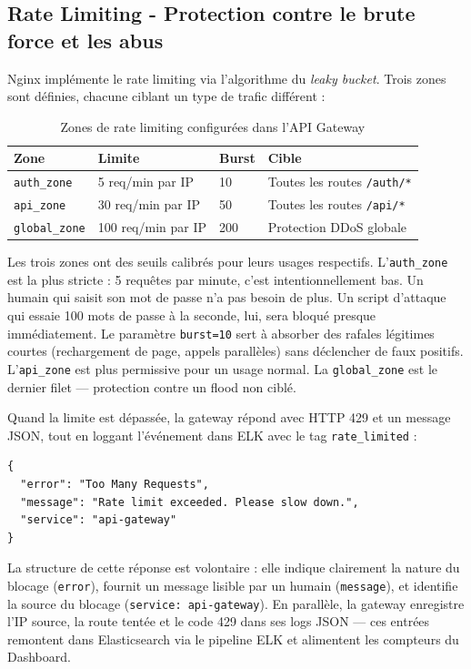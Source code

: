 \documentclass[12pt, a4paper]{report}
\begin{document}
\subsection{Rate Limiting - Protection contre le brute force et les abus}

Nginx implémente le rate limiting via l'algorithme du \textit{leaky bucket}. Trois zones sont définies, chacune ciblant un type de trafic différent :

\begin{table}[H]
  \centering
  \caption{Zones de rate limiting configurées dans l'API Gateway}
  \begin{tabular}{@{}llll@{}}
    \toprule
    \textbf{Zone} & \textbf{Limite} & \textbf{Burst} & \textbf{Cible} \\
    \midrule
    \texttt{auth\_zone}   & 5 req/min par IP  & 10  & Toutes les routes \texttt{/auth/*} \\
    \texttt{api\_zone}    & 30 req/min par IP & 50  & Toutes les routes \texttt{/api/*} \\
    \texttt{global\_zone} & 100 req/min par IP & 200 & Protection DDoS globale \\
    \bottomrule
  \end{tabular}
\end{table}

\medskip
Les trois zones ont des seuils calibrés pour leurs usages respectifs. L'\texttt{auth\_zone} est la plus stricte : 5 requêtes par minute, c'est intentionnellement bas. Un humain qui saisit son mot de passe n'a pas besoin de plus. Un script d'attaque qui essaie 100 mots de passe à la seconde, lui, sera bloqué presque immédiatement. Le paramètre \texttt{burst=10} sert à absorber des rafales légitimes courtes (rechargement de page, appels parallèles) sans déclencher de faux positifs. L'\texttt{api\_zone} est plus permissive pour un usage normal. La \texttt{global\_zone} est le dernier filet — protection contre un flood non ciblé.

Quand la limite est dépassée, la gateway répond avec HTTP 429 et un message JSON, tout en loggant l'événement dans ELK avec le tag \texttt{rate\_limited} :

\begin{lstlisting}[style=yaml, caption={Réponse HTTP 429 personnalisée retournée par la gateway}]
{
  "error": "Too Many Requests",
  "message": "Rate limit exceeded. Please slow down.",
  "service": "api-gateway"
}
\end{lstlisting}

\medskip
La structure de cette réponse est volontaire : elle indique clairement la nature du blocage (\texttt{error}), fournit un message lisible par un humain (\texttt{message}), et identifie la source du blocage (\texttt{service: api-gateway}). En parallèle, la gateway enregistre l'IP source, la route tentée et le code 429 dans ses logs JSON — ces entrées remontent dans Elasticsearch via le pipeline ELK et alimentent les compteurs du Dashboard.
\end{document}

